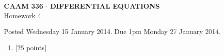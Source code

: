\documentclass[10pt]{article}
\begin{document}
\vspace*{-5em}
\begin{center}
\large \textsf{\textbf{CAAM 336 $\cdot$ DIFFERENTIAL EQUATIONS}\\[0.5em]
Homework 4 }
\end{center}

Posted Wednesday 15 January 2014.  Due 1pm Monday 27 January 2014.

\begin{enumerate}\addtocounter{enumi}{3}
\item {[25 points]} \\ 
\end{enumerate}
\end{document}
